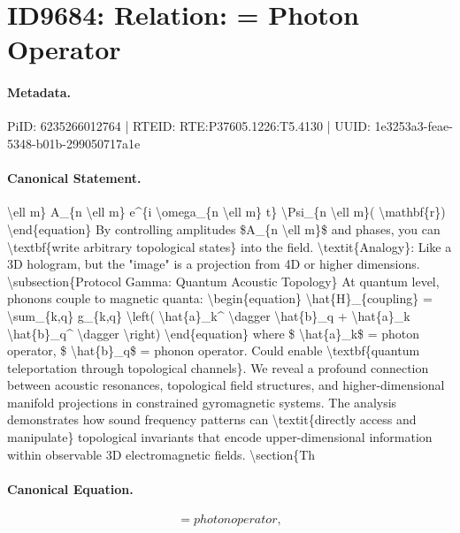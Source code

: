 \section*{ID9684: Relation: = Photon Operator}
\paragraph{Metadata.}
PiID: 6235266012764 | RTEID: RTE:P37605.1226:T5.4130 | UUID: 1e3253a3-feae-5348-b01b-299050717a1e

\paragraph{Canonical Statement.}
\textbackslash{}ell m\} A\_\{n \textbackslash{}ell m\} e\textasciicircum{}\{i \textbackslash{}omega\_\{n \textbackslash{}ell m\} t\} \textbackslash{}Psi\_\{n \textbackslash{}ell m\}( \textbackslash{}mathbf\{r\}) \textbackslash{}end\{equation\} By controlling amplitudes \$A\_\{n \textbackslash{}ell m\}\$ and phases, you can \textbackslash{}textbf\{write arbitrary topological states\} into the field. \textbackslash{}textit\{Analogy\}: Like a 3D hologram, but the "image" is a projection from 4D or higher dimensions. \textbackslash{}subsection\{Protocol Gamma: Quantum Acoustic Topology\} At quantum level, phonons couple to magnetic quanta: \textbackslash{}begin\{equation\} \textbackslash{}hat\{H\}\_\{coupling\} = \textbackslash{}sum\_\{k,q\} g\_\{k,q\} \textbackslash{}left( \textbackslash{}hat\{a\}\_k\textasciicircum{} \textbackslash{}dagger \textbackslash{}hat\{b\}\_q + \textbackslash{}hat\{a\}\_k \textbackslash{}hat\{b\}\_q\textasciicircum{} \textbackslash{}dagger \textbackslash{}right) \textbackslash{}end\{equation\} where \$ \textbackslash{}hat\{a\}\_k\$ = photon operator, \$ \textbackslash{}hat\{b\}\_q\$ = phonon operator. Could enable \textbackslash{}textbf\{quantum teleportation through topological channels\}. We reveal a profound connection between acoustic resonances, topological field structures, and higher-dimensional manifold projections in constrained gyromagnetic systems. The analysis demonstrates how sound frequency patterns can \textbackslash{}textit\{directly access and manipulate\} topological invariants that encode upper-dimensional information within observable 3D electromagnetic fields. \textbackslash{}section\{Th

\paragraph{Canonical Equation.}
\[
= photon operator,
\]

